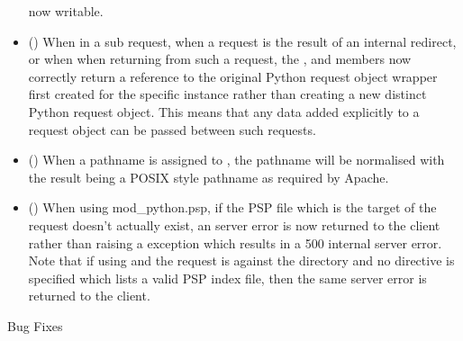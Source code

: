 \begin{itemize}
      now writable.
    \item
      ()
      When in a sub request, when a request is the result of an internal
      redirect, or when when returning from such a request, the
      ,  and  members now
      correctly return a reference to the original Python request object
      wrapper first created for the specific  instance
      rather than creating a new distinct Python request object. This means
      that any data added explicitly to a request object can be passed
      between such requests.
    \item
      ()
      When a pathname is assigned to , the pathname will be
      normalised with the result being a POSIX style pathname as required by
      Apache.
    \item
      ()
      When using mod_python.psp, if the PSP file which is the target of the
      request doesn't actually exist, an  server
      error is now returned to the client rather than raising a
       exception which results in a 500 internal server error.
      Note that if using  and the request is against the
      directory and no  directive is specified which
      lists a valid PSP index file, then the same 
      server error is returned to the client.
  \end{itemize}

  Bug Fixes

